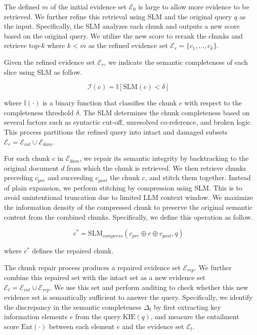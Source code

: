 The defined $m$ of the initial evidence set $\mathcal{E}_0$ is large to allow more evidence to be retrieved.
We further refine this retrieval using SLM and the original query $q$ as the input.
Specifically, the SLM analyzes each chunk and outputs a new score based on the original query.
We utilize the new score to rerank the chunks and retrieve top-$k$ where $k < m$ as the refined evidence set $\mathcal{E}_r=\{c_1, \dots, c_k\}$.

Given the refined evidence set $\mathcal{E}_r$, we indicate the semantic completeness of each slice using SLM as follow.

\begin{equation}
    \mathcal{I}(c) = \mathbb{I}\left[\text{SLM}(c) < \delta\right]
\end{equation}

\noindent
where $\mathbb{I}(\cdot)$ is a binary function that classifies the chunk $c$ with respect to the completeness threshold $\delta$.
The SLM determines the chunk completeness based on several factors such as syntactic cut-off, unresolved co-reference, and broken logic.
This process partitions the refined query into intact and damaged subsets $\mathcal{E}_r=\mathcal{E}_{int} \cup\mathcal{E}_{dam}$. 

For each chunk $c$ in $\mathcal{E}_{dam}$, we repair its semantic integrity by backtracking to the original document $d$ from which the chunk is retrieved.
We then retrieve chunks preceding $c_{pre}$ and succeeding $c_{post}$ the chunk $c$, and stitch them together.
Instead of plain expansion, we perform stitching by compression using SLM.
This is to avoid unintentional truncation due to limited LLM context window.
We maximize the information density of the compressed chunk to preserve the original semantic content from the combined chunks.
Specifically, we define this operation as follow.

\begin{equation}
    c^* = \text{SLM}_{compress}(c_{pre} \oplus c \oplus c_{post}, q)
\end{equation} 

\noindent
where $c^*$ defines the repaired chunk.

The chunk repair process produces a repaired evidence set $\mathcal{E}_{rep}$.
We further combine this repaired set with the intact set as a new evidence set $\mathcal{E}_t =\mathcal{E}_{int} \cup\mathcal{E}_{rep}$.
We use this set and perform auditing to check whether this new evidence set is semantically sufficient to answer the query.
Specifically, we identify the discrepancy in the semantic completeness $\Delta_t$ by first extracting key information elements $e$ from the query $\text{KIE}(q)$, and measure the entailment score $\text{Ent}(\cdot)$ between each element $e$ and the evidence set $\mathcal{E}_t$.

